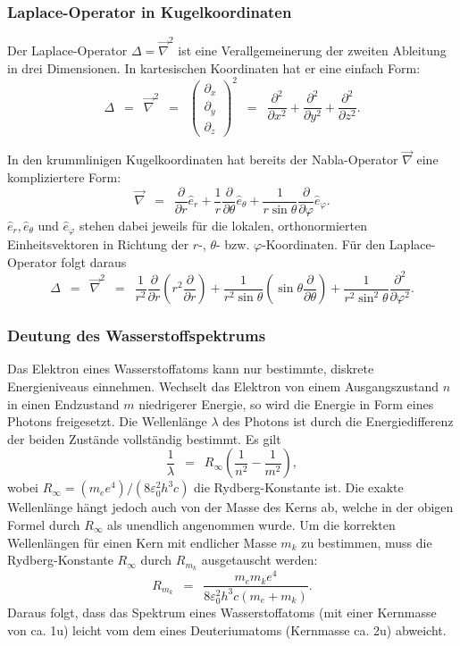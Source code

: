 \documentclass{article}
\newcommand{\widespace}{\enspace}
\newcommand{\wideeq}{\widespace = \widespace}
\newcommand{\pd}[2]{
    \frac{\partial #1}{\partial #2}
}
\begin{document}
\cite[25--32, 55--57]{gri_qm}


\subsubsection{Laplace-Operator in Kugelkoordinaten}

Der Laplace-Operator $\Delta = \vec \nabla^2$ ist eine Verallgemeinerung der zweiten
Ableitung in drei Dimensionen. In kartesischen Koordinaten hat er eine einfach Form:
\[
    \Delta \wideeq \vec \nabla^2 \wideeq \begin{pmatrix}
        \partial_x \\ \partial_y \\ \partial_z
    \end{pmatrix}^2
    \wideeq \pd{^2}{x^2} + \pd{^2}{y^2} + \pd{^2}{z^2}.
\]

In den krummlinigen Kugelkoordinaten hat bereits der Nabla-Operator $\vec \nabla$
eine kompliziertere Form:
\[
    \vec \nabla \wideeq
    \pd{}{r} \hat e_r + \frac 1 r \pd{}{\theta} \hat e_\theta
    + \frac{1}{r \sin \theta} \pd{}{\varphi} \hat e_\varphi.
\]
$\hat e_r, \hat e_\theta$ und $\hat e_\varphi$ stehen dabei jeweils für die
lokalen, orthonormierten Einheitsvektoren in Richtung der $r$-, $\theta$- bzw.
$\varphi$-Koordinaten.
Für den Laplace-Operator folgt daraus
\[
    \Delta \wideeq \vec \nabla^2
    \wideeq \frac{1}{r^2} \pd{}{r} \left( r^2 \pd{}{r} \right)
    + \frac{1}{r^2 \sin \theta} \left( \sin \theta \pd{}{\theta} \right)
    + \frac{1}{r^2 \sin^2 \theta} \pd{^2}{\varphi^2}.
\]

\cite[42]{gri_ed}


\subsubsection{Deutung des Wasserstoffspektrums}

Das Elektron eines Wasserstoffatoms kann nur bestimmte, diskrete Energieniveaus
einnehmen. Wechselt das Elektron von einem Ausgangszustand $n$ in einen Endzustand
$m$ niedrigerer Energie, so wird die Energie in Form eines Photons freigesetzt.
Die Wellenlänge $\lambda$ des Photons ist durch die Energiedifferenz der beiden
Zustände vollständig bestimmt. Es gilt
\[
    \frac 1 \lambda \wideeq R_\infty \left( \frac{1}{n^2} - \frac{1}{m^2} \right),
\]
wobei $R_\infty = (m_e e^4) / (8 \varepsilon_0^2 h^3 c)$ die Rydberg-Konstante ist.
Die exakte Wellenlänge hängt jedoch auch von der Masse des Kerns ab, welche
in der obigen Formel durch $R_\infty$ als unendlich angenommen wurde.
Um die korrekten Wellenlängen für einen Kern mit endlicher Masse $m_k$ zu bestimmen,
muss die Rydberg-Konstante $R_\infty$ durch $R_{m_k}$ ausgetauscht werden:
\[
    R_{m_k} \wideeq \frac{m_e m_k e^4}{8 \varepsilon_0^2 h^3 c (m_e + m_k)}.
\]
Daraus folgt, dass das Spektrum eines Wasserstoffatoms (mit einer Kernmasse von
ca. 1u) leicht vom dem eines Deuteriumatoms (Kernmasse ca. 2u) abweicht.
\end{document}
